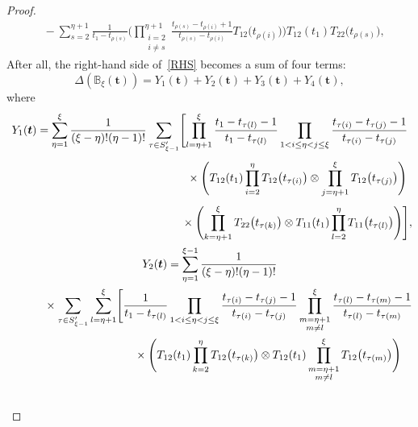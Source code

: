 \documentclass[pdftex]{sigma}
\numberwithin{equation}{section}
\begin{document}
\begin{proof}
\begin{align*}
&{}{-}\sum_{s=2}^{\eta+1} \frac{1}{t_1-t_{\rho(s)}}\Biggl( \prod_{\substack{i=2\\i\neq s}}^{\eta+1} \frac{t_{\rho(s)}-t_{\rho(i)}+1}{t_{\rho(s)}-t_{\rho(i)}} T_{12} \bigl(t_{\rho(i)}\bigr) \Biggr) T_{12} (t_1)T_{22} \bigl(t_{\rho(s)}\bigr),
\end{align*}
After all, the right-hand side of~\eqref{RHS} becomes a sum of four terms:
\begin{equation*}
\Delta ( {\mathbb{B}}_\xi(\boldsymbol{t}) )=Y_1(\boldsymbol{t})+Y_2(\boldsymbol{t})+Y_3(\boldsymbol{t})+Y_4(\boldsymbol{t}),
\end{equation*}
where
\begin{gather*}
 Y_1(\boldsymbol{t})= \sum_{\eta=1}^{\xi} \frac{1}{(\xi-\eta) ! (\eta-1)!} \sum_{\tau\in S_{\xi-1}'} \Biggl[ \prod_{l=\eta+1}^{\xi } \frac{t_1-t_{\tau(l)}-1}{t_1-t_{\tau(l)}} \prod_{1< i\leq\eta<j \leq \xi} \frac{t_{\tau(i)}-t_{\tau(j)}-1}{t_{\tau(i)}-t_{\tau(j)}}\\[1mm]
 \hphantom{Y_1(\boldsymbol{t})= \sum_{\eta=1}^{\xi} \frac{1}{(\xi-\eta) ! (\eta-1)!} \sum_{\tau\in S_{\xi-1}'} \Biggl[}{}
 \times\Biggl(T_{12}(t_1) \prod_{i=2}^{\eta} T_{12} \bigl(t_{\tau(i)}\bigr) \otimes \prod_{j=\eta+1}^{\xi} T_{12} \bigl(t_{\tau(j)}\bigr) \Biggr)\\[1mm]
 \hphantom{Y_1(\boldsymbol{t})= \sum_{\eta=1}^{\xi} \frac{1}{(\xi-\eta) ! (\eta-1)!} \sum_{\tau\in S_{\xi-1}'} \Biggl[}{}
 \times \Biggl(\prod_{k=\eta+1}^{\xi } T _{22}\bigl(t_{\tau(k)}\bigr)\otimes T_{11}(t_1) \prod_{l=2}^{\eta} T _{11}\bigl(t_{\tau(l)}\bigr)\Biggr)\Biggr],
\\
Y_2(\boldsymbol{t})= \sum_{\eta=1}^{\xi-1} \frac{1}{(\xi-\eta) ! (\eta-1)!} \\
\hphantom{Y_2(\boldsymbol{t})= }{}
\times \sum_{\tau\in S_{\xi-1}'} \sum_{l=\eta+1}^\xi \Biggl[ \frac{1}{t_1-t_{\tau(l)}}\prod_{1< i\leq\eta<j \leq \xi} \frac{t_{\tau(i)}-t_{\tau(j)}-1}{t_{\tau(i)}-t_{\tau(j)}} \prod_{\substack{m=\eta+1\\m\neq l}}^\xi \frac{t_{\tau(l)}-t_{\tau(m)}-1}{t_{\tau(l)}-t_{\tau(m)}} \\
\hphantom{Y_2(\boldsymbol{t})=\times \sum_{\tau\in S_{\xi-1}'} \sum_{l=\eta+1}^\xi \Biggl[}{}
 \times\Biggl( T_{12} (t_1)\prod_{k=2}^{\eta} T_{12} \bigl(t_{\tau(k)}\bigr) \otimes T_{12}(t_1) \prod_{\substack{m=\eta+1\\m\neq l}}^\xi T_{12} \bigl(t_{\tau(m)}\bigr)\Biggr)\\
\hphantom{Y_2(\boldsymbol{t})=\times \sum_{\tau\in S_{\xi-1}'} \sum_{l=\eta+1}^\xi \Biggl[}{}

\end{gather*}
\end{proof}
\end{document}
